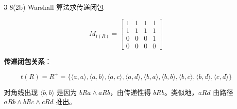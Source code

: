 \documentclass[11pt]{article}
\begin{document}
\begin{question}{3-8(2b) Warshall 算法求传递闭包}
\begin{answer}
    $$M_{t(R)} = \begin{bmatrix} 1 & 1 & 1 & 1 \\ 1 & 1 & 1 & 1 \\ 0 & 0 & 0 & 1 \\ 0 & 0 & 0 & 0 \end{bmatrix}$$

    \textbf{传递闭包关系}：

    $$t(R) = R^+ = \{\langle a,a\rangle, \langle a,b\rangle, \langle a,c\rangle, \langle a,d\rangle, \langle b,a\rangle, \langle b,b\rangle, \langle b,c\rangle, \langle b,d\rangle, \langle c,d\rangle\}$$

    \begin{info}[验证:]
      对角线出现 $\langle b,b\rangle$ 是因为 $bRa \land aRb$，由传递性得 $bRb$。类似地，$aRd$ 由路径 $aRb \land bRc \land cRd$ 推出。
    \end{info}
  \end{answer}
\end{question}

\end{document}
